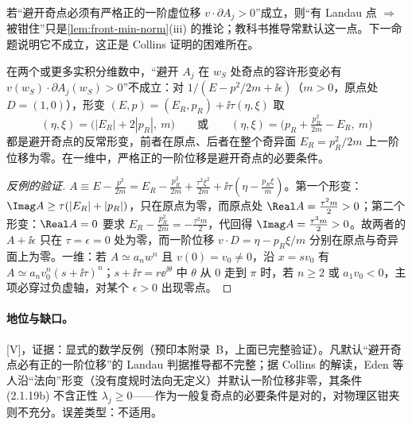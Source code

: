 
若“避开奇点必须有严格正的一阶虚位移 $v\cdot\partial A_j>0$”成立，则“有 Landau 点 $\Rightarrow$ 被钳住”只是\cref{lem:front-min-norm}(iii) 的推论；教科书推导常默认这一点。下一命题说明它不成立，这正是 Collins 证明的困难所在。

\begin{proposition}\label{prop:front-anomalous}
在两个或更多实积分维数中，“避开 $A_j$ 在 $w_S$ 处奇点的容许形变必有 $v(w_S)\cdot\partial A_j(w_S)>0$”不成立：对 $1/(E-p^2/2m+\ii\epsilon)$（$m>0$，原点处 $D=(1,0)$），形变 $(E,p)=(E_R,p_R)+\ii\tau(\eta,\xi)$ 取
\begin{equation}\label{eq:front-anomalous}
(\eta,\xi)=\bigl(|E_R|+2|p_R|,\ m\bigr)\qquad\text{或}\qquad(\eta,\xi)=\bigl(p_R+\tfrac{p_R^2}{2m}-E_R,\ m\bigr)
\end{equation}
都是避开奇点的反常形变，前者在原点、后者在整个奇异面 $E_R=p_R^2/2m$ 上一阶位移为零\cite[附录~B.1]{Collins:2020euz}。在一维中，严格正的一阶位移是避开奇点的必要条件\cite[附录~B.2]{Collins:2020euz}。
\end{proposition}

\begin{proof}[反例的验证]
$A\equiv E-\frac{p^2}{2m}=E_R-\frac{p_R^2}{2m}+\frac{\tau^2\xi^2}{2m}+\ii\tau(\eta-\frac{p_R\xi}{m})$。第一个形变：$\Imag A\ge\tau(|E_R|+|p_R|)$，只在原点为零，而原点处 $\Real A=\frac{\tau^2m}2>0$；第二个形变：$\Real A=0$ 要求 $E_R-\frac{p_R^2}{2m}=-\frac{\tau^2m}2$，代回得 $\Imag A=\frac{\tau^3m}2>0$。故两者的 $A+\ii\epsilon$ 只在 $\tau=\epsilon=0$ 处为零，而一阶位移 $v\cdot D=\eta-p_R\xi/m$ 分别在原点与奇异面上为零。一维：若 $A\simeq a_nw^n$ 且 $v(0)=v_0\ne0$，沿 $x=sv_0$ 有 $A\simeq a_nv_0^n(s+\ii\tau)^n$；$s+\ii\tau=r\ee^{\ii\theta}$ 中 $\theta$ 从 $0$ 走到 $\pi$ 时，若 $n\ge2$ 或 $a_1v_0<0$，主项必穿过负虚轴，对某个 $\epsilon>0$ 出现零点。
\end{proof}

\paragraph{地位与缺口。}[V]，证据：显式的数学反例（预印本\cite{Collins:2020euz}附录~B，上面已完整验证）。凡默认“避开奇点必有正的一阶位移”的 Landau 判据推导都不完整；据 Collins 的解读\cite[第~IV~节]{Collins:2020euz}，Eden 等人\cite[第~2.1~节]{EdenEtAl1966}沿“法向”形变（没有度规时法向无定义）并默认一阶位移非零，其条件 (2.1.19b) 不含正性 $\lambda_j\ge0$——作为一般复奇点的必要条件是对的，对物理区钳夹则不充分。误差类型：不适用。

